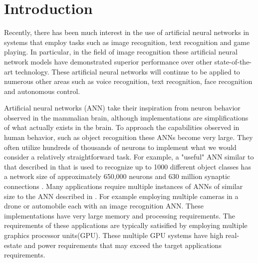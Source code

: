 
\section{Introduction}
\label{sec:chap-one}

Recently, there has been much interest in the use of artificial neural networks  
in systems that employ tasks such as image recognition\cite{krizhevsky2012imagenet}, text recognition\cite{qiu2013parallel} 
and game playing\cite{maddison2014move}.
In particular, in the field of image recognition these artificial neural network models have demonstrated superior performance
over other state-of-the-art technology\cite{krizhevsky2012imagenet}.
These artificial neural networks will continue to be applied to numerous other areas such as voice recognition, text recognition, 
face recognition and autonomous control.

Artificial neural networks (ANN) take their inspiration from neuron behavior observed in the mammalian brain, although
implementations are simplifications of what actually exists in the brain.
To approach the capabilities observed in human behavior, such as object recognition these ANNs become very large.
They often utilize hundreds of thousands of neurons to implement what we would consider a relatively straightforward task.
For example, a "useful" ANN similar to that described in \cite{krizhevsky2012imagenet} that is used
to recognize up to 1000 different object classes has a network size of approximately 650,000 neurons and 
630 million synaptic connections \cite{krizhevsky2012imagenetPreso}. 
Many applications require multiple instances of ANNs of similar size to the ANN described in \cite{krizhevsky2012imagenet}.
For example employing multiple cameras in a drone or automobile each with an image recognition ANN\cite{krizhevsky2012imagenet}\cite{bojarski2016end}.
These implementations have very large memory and processing requirements.
The requirements of these applications are typically satisified by employing multiple graphics processor units(GPU).
These multiple GPU systems have high real-estate and power requirements that may exceed the target applications requirements.

